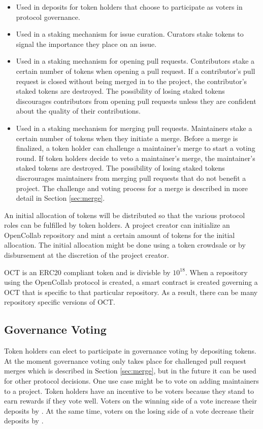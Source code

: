 \begin{itemize}
  \item Used in deposits for token holders that choose to participate as voters
    in protocol governance.
  \item Used in a staking mechanism for issue curation. Curators stake tokens to
    signal the importance they place on an issue.
  \item Used in a staking mechanism for opening pull requests. Contributors
    stake a certain number of tokens when opening a pull request. If a
    contributor's pull request is closed without being merged in to the project,
    the contributor's staked tokens are destroyed. The possibility of losing
    staked tokens discourages contributors from opening pull requests unless
    they are confident about the quality of their contributions.
  \item Used in a staking mechanism for merging pull requests. Maintainers stake
    a certain number of tokens when they initiate a merge. Before a merge is
    finalized, a token holder can challenge a maintainer's merge to start a
    voting round. If token holders decide to veto a maintainer's merge, the
    maintainer's staked tokens are destroyed. The possibility of losing staked
    tokens discrourages maintainers from merging pull requests that do not
    benefit a project. The challenge and voting process for a merge is described
    in more detail in Section \ref{sec:merge}.
\end{itemize}

An initial allocation of tokens will be distributed so that the various protocol
roles can be fulfilled by token holders. A project creator can initialize an OpenCollab repository and mint a certain amount of
tokens for the initial allocation. The initial allocation might be done using a
token crowdsale or by disbursement at the discretion of the project creator.

OCT is an ERC20 compliant token\cite{erc20} and is divisble by $10^{18}$. When a
repository using the OpenCollab protocol is created, a smart contract is created
governing a OCT that is specific to that particular repository. As a result,
there can be many repository specific versions of OCT.

\subsection{Governance Voting}

Token holders can elect to participate in governance voting by depositing
 tokens. At the moment governance voting only takes place
for challenged pull request merges which is described in Section
\ref{sec:merge}, but in the future it can be used for other
protocol decisions. One use case might be to vote on adding maintainers to a
project. Token holders have an incentive to be voters because they stand
to earn rewards if they vote well. Voters on the winning side of a vote increase
their deposits by . At the same time, voters on
the losing side of a vote decrease their deposits by .


